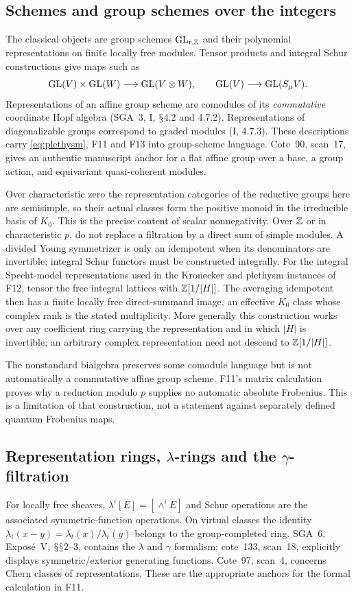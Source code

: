 \documentclass[11pt,a4paper]{article}
\renewcommand{\S}{\ensuremath{\mathsection}}
\newcommand{\fid}[1]{\textsf{#1}}\newcommand{\gate}[1]{\textsf{#1}}
\theoremstyle{named}\newtheorem{finding}{Finding}[section]
\theoremstyle{definition}\newtheorem{definition}[finding]{Definition}
\theoremstyle{remark}\newtheorem{remark}[finding]{Remark}
\begin{document}
\subsection{Schemes and group schemes over the integers}
The classical objects are group schemes $\mathrm{GL}_{r,\mathbb Z}$ and their polynomial representations on finite locally free modules. Tensor products and integral Schur constructions give maps such as
\[
 \mathrm{GL}(V)\times\mathrm{GL}(W)\longrightarrow\mathrm{GL}(V\otimes W),\qquad
 \mathrm{GL}(V)\longrightarrow\mathrm{GL}(S_\mu V).
\]
Representations of an affine group scheme are comodules of its \emph{commutative} coordinate Hopf algebra (SGA~3, I, \S4.2 and 4.7.2). Representations of diagonalizable groups correspond to graded modules (I, 4.7.3). These descriptions carry \eqref{eq:plethysm}, \fid{F11} and \fid{F13} into group-scheme language. Cote~90, scan~17, gives an authentic manuscript anchor for a flat affine group over a base, a group action, and equivariant quasi-coherent modules.

Over characteristic zero the representation categories of the reductive groups here are semisimple, so their actual classes form the positive monoid in the irreducible basis of $K_0$. This is the precise content of scalar nonnegativity. Over $\mathbb Z$ or in characteristic $p$, do not replace a filtration by a direct sum of simple modules. A divided Young symmetrizer is only an idempotent when its denominators are invertible; integral Schur functors must be constructed integrally. For the integral Specht-model representations used in the Kronecker and plethysm instances of \fid{F12}, tensor the free integral lattices with $\mathbb Z[1/|H|]$. The averaging idempotent then has a finite locally free direct-summand image, an effective $K_0$ class whose complex rank is the stated multiplicity. More generally this construction works over any coefficient ring carrying the representation and in which $|H|$ is invertible; an arbitrary complex representation need not descend to $\mathbb Z[1/|H|]$.

The nonstandard bialgebra preserves some comodule language but is not automatically a commutative affine group scheme. \fid{F11}'s matrix calculation proves why a reduction modulo $p$ supplies no automatic absolute Frobenius. This is a limitation of that construction, not a statement against separately defined quantum Frobenius maps.

\subsection{Representation rings, $\lambda$-rings and the $\gamma$-filtration}
For locally free sheaves, $\lambda^i[E]=[\wedge^iE]$ and Schur operations are the associated symmetric-function operations. On virtual classes the identity $\lambda_t(x-y)=\lambda_t(x)/\lambda_t(y)$ belongs to the group-completed ring. SGA~6, Expos\'e~V, \S\S2--3, contains the $\lambda$ and $\gamma$ formalism; cote~133, scan~18, explicitly displays symmetric/exterior generating functions. Cote~97, scan~4, concerns Chern classes of representations. These are the appropriate anchors for the formal calculation in \fid{F11}.
\end{document}
